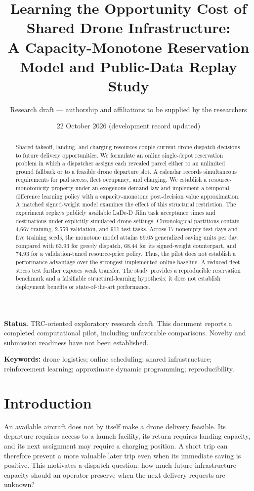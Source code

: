 \documentclass[11pt,a4paper]{article}
\title{Learning the Opportunity Cost of Shared Drone Infrastructure:\\A Capacity-Monotone Reservation Model and Public-Data Replay Study}
\author{Research draft --- authorship and affiliations to be supplied by the researchers}
\date{22 October 2026 (development record updated)}
\begin{document}
\maketitle
\noindent\textbf{Status.} TRC-oriented exploratory research draft. This document reports a completed computational pilot, including unfavorable comparisons. Novelty and submission readiness have not been established.

\begin{abstract}
Shared takeoff, landing, and charging resources couple current drone dispatch decisions to future delivery opportunities. We formulate an online single-depot reservation problem in which a dispatcher assigns each revealed parcel either to an unlimited ground fallback or to a feasible drone departure slot. A calendar records simultaneous requirements for pad access, fleet occupancy, and charging. We establish a resource-monotonicity property under an exogenous demand law and implement a temporal-difference learning policy with a capacity-monotone post-decision value approximation. A matched signed-weight model examines the effect of this structural restriction. The experiment replays publicly available LaDe-D Jilin task acceptance times and destinations under explicitly simulated drone settings. Chronological partitions contain 4,667 training, 2,559 validation, and 911 test tasks. Across 17 nonempty test days and five training seeds, the monotone model attains 69.05 generalized saving units per day, compared with 63.93 for greedy dispatch, 68.44 for its signed-weight counterpart, and 74.93 for a validation-tuned resource-price policy. Thus, the pilot does not establish a performance advantage over the strongest implemented online baseline. A reduced-fleet stress test further exposes weak transfer. The study provides a reproducible reservation benchmark and a falsifiable structural-learning hypothesis; it does not establish deployment benefits or state-of-the-art performance.
\end{abstract}
\noindent\textbf{Keywords:} drone logistics; online scheduling; shared infrastructure; reinforcement learning; approximate dynamic programming; reproducibility.

\section{Introduction}
An available aircraft does not by itself make a drone delivery feasible. Its departure requires access to a launch facility, its return requires landing capacity, and its next assignment may require a charging position. A short trip can therefore prevent a more valuable later trip even when its immediate saving is positive. This motivates a dispatch question: how much future infrastructure capacity should an operator preserve when the next delivery requests are unknown?
\end{document}
